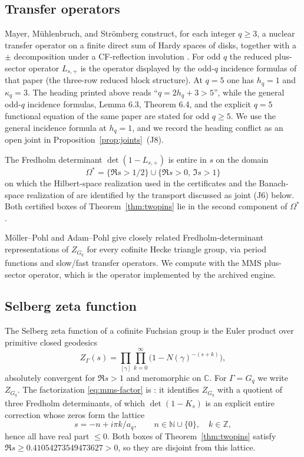 \documentclass[11pt]{amsart}
\theoremstyle{definition}
\theoremstyle{remark}
\newcommand{\Gq}{G_q}
\newcommand{\Zq}{Z_{G_q}}
\newcommand{\detp}{\det(1-L_{s,+})}
\begin{document}
\subsection{Transfer operators}
\label{sec:to}

Mayer, M\"uhlenbruch, and Str\"omberg construct, for each integer
$q\ge 3$, a nuclear transfer operator on a finite direct sum of Hardy
spaces of disks, together with a $\pm$ decomposition under a
CF-reflection involution \cite{MMS2012}. For odd $q$ the reduced
plus-sector operator $L_{s,+}$ is the operator displayed by the
odd-$q$ incidence formulas of that paper (the three-row reduced
block structure). At $q=5$ one has $h_q=1$ and $\kappa_q=3$. The
heading printed above \cite[(34)]{MMS2012} reads
``$q=2h_q+3>5$'', while the general odd-$q$ incidence formulas, Lemma
6.3, Theorem 6.4, and the explicit $q=5$ functional equation of the
same paper are stated for odd $q\ge 5$. We use the general incidence
formula at $h_q=1$, and we record the heading conflict as an open
joint in Proposition~\ref{prop:joints}~(J8).

The Fredholm determinant $\detp$ is entire in $s$ on the domain
\begin{equation}
\label{eq:omega-star}
\Omega^*=\{\Re s>1/2\}\cup\{\Re s>0,\,\Im s>1\}
\end{equation}
on which the Hilbert-space realization used in the certificates and
the Banach-space realization of \cite{MMS2012} are identified by the
transport discussed as joint (J6) below. Both certified boxes of
Theorem~\ref{thm:twopins} lie in the second component of
$\Omega^*$.

M\"oller--Pohl \cite{MoellerPohl2013} and Adam--Pohl \cite{AdamPohl2020}
give closely related Fredholm-determinant representations of
$\Zq$ for every cofinite Hecke triangle group, via period functions
and slow/fast transfer operators. We compute with the MMS plus-sector
operator, which is the operator implemented by the archived engine.

\subsection{Selberg zeta function}
\label{sec:selberg-zeta}

The Selberg zeta function of a cofinite Fuchsian group is the
Euler product over primitive closed geodesics
\begin{equation}
\label{eq:selberg-product}
Z_\Gamma(s)=\prod_{[\gamma]}\prod_{k=0}^\infty
\bigl(1-N(\gamma)^{-(s+k)}\bigr),
\end{equation}
absolutely convergent for $\Re s>1$ and meromorphic on $\mathbb C$.
For $\Gamma=\Gq$ we write $\Zq$. The factorization
\eqref{eq:mms-factor} is \cite[Theorem 6.4]{MMS2012}: it identifies
$\Zq$ with a quotient of three Fredholm determinants, of which
$\det(1-K_s)$ is an explicit entire correction whose zeros form the
lattice
\begin{equation}
\label{eq:ks-lattice}
s=-n+i\pi k/a_q,\qquad n\in\mathbb N\cup\{0\},\quad k\in\mathbb Z,
\end{equation}
hence all have real part $\le 0$. Both boxes of
Theorem~\ref{thm:twopins} satisfy $\Re s\ge 0.41054273549473627>0$, so
they are disjoint from this lattice.
\end{document}
